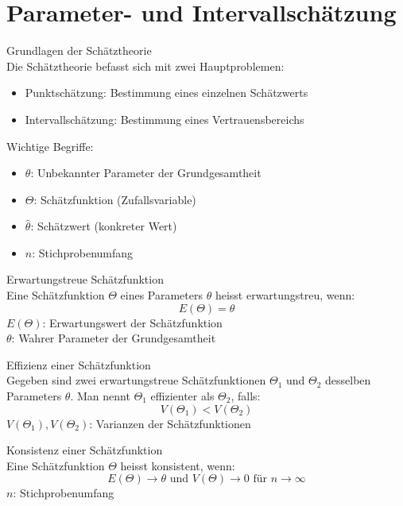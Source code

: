 \section{Parameter- und Intervallschätzung}

\begin{concept}{Grundlagen der Schätztheorie}\\
Die Schätztheorie befasst sich mit zwei Hauptproblemen:
\begin{itemize}
  \item Punktschätzung: Bestimmung eines einzelnen Schätzwerts
  \item Intervallschätzung: Bestimmung eines Vertrauensbereichs
\end{itemize}

Wichtige Begriffe:
\begin{itemize}
  \item $\theta$: Unbekannter Parameter der Grundgesamtheit
  \item $\Theta$: Schätzfunktion (Zufallsvariable)
  \item $\hat{\theta}$: Schätzwert (konkreter Wert)
  \item $n$: Stichprobenumfang
\end{itemize}
\end{concept}

\begin{definition}{Erwartungstreue Schätzfunktion}\\
Eine Schätzfunktion $\Theta$ eines Parameters $\theta$ heisst erwartungstreu, wenn:
$$
E(\Theta)=\theta
$$
$E(\Theta)$: Erwartungswert der Schätzfunktion\\
$\theta$: Wahrer Parameter der Grundgesamtheit
\end{definition}

\begin{definition}{Effizienz einer Schätzfunktion}\\
Gegeben sind zwei erwartungstreue Schätzfunktionen $\Theta_1$ und $\Theta_2$ desselben Parameters $\theta$. Man nennt $\Theta_1$ effizienter als $\Theta_2$, falls:
$$
V(\Theta_1)<V(\Theta_2)
$$
$V(\Theta_1), V(\Theta_2)$: Varianzen der Schätzfunktionen
\end{definition}

\begin{definition}{Konsistenz einer Schätzfunktion}\\
Eine Schätzfunktion $\Theta$ heisst konsistent, wenn:
$$
E(\Theta) \rightarrow \theta \text{ und } V(\Theta) \rightarrow 0 \text{ für } n \rightarrow \infty
$$
$n$: Stichprobenumfang
\end{definition}

